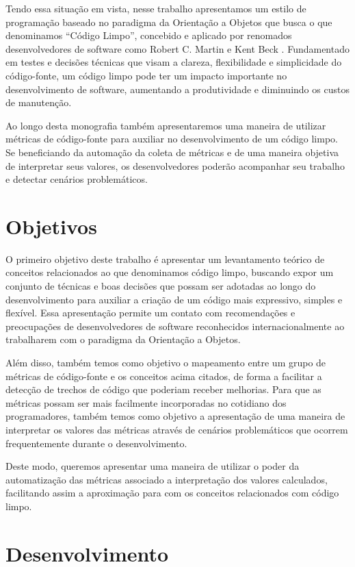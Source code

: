 Tendo essa situação em vista, nesse trabalho apresentamos um estilo de programação baseado
no paradigma da Orientação a Objetos que busca o que denominamos ``Código Limpo'', concebido e aplicado por renomados desenvolvedores de software
como Robert C. Martin \citep{Martin2008} e Kent Beck \citep{Beck2007}. Fundamentado em testes e decisões técnicas que visam a clareza, flexibilidade
e simplicidade do código-fonte, um código limpo pode ter um impacto importante no desenvolvimento 
de software, aumentando a produtividade e diminuindo os custos de manutenção.

Ao longo desta monografia também apresentaremos uma maneira de utilizar métricas de código-fonte para auxiliar no desenvolvimento
de um código limpo. Se beneficiando da automação da coleta de métricas e de uma maneira objetiva de interpretar seus valores,
os desenvolvedores poderão acompanhar seu trabalho e detectar cenários problemáticos.

\section{Objetivos}
\label{sec:objetivo}

O primeiro objetivo deste trabalho é apresentar um levantamento teórico de conceitos relacionados ao que denominamos
código limpo, buscando expor um conjunto de técnicas e boas decisões que possam ser adotadas ao longo do 
desenvolvimento para auxiliar a criação de um código mais expressivo, simples e flexível. Essa apresentação permite um 
contato com recomendações e preocupações de desenvolvedores de software reconhecidos internacionalmente ao trabalharem com 
o paradigma da Orientação a Objetos.

Além disso, também temos como objetivo o mapeamento entre um grupo de métricas de código-fonte e os conceitos acima 
citados, de forma a facilitar a detecção de trechos de código que poderiam receber melhorias. Para que as 
métricas possam ser mais facilmente incorporadas no cotidiano dos programadores, também temos como objetivo a apresentação 
de uma maneira de interpretar os valores das métricas através de cenários problemáticos que ocorrem frequentemente durante
o desenvolvimento.

Deste modo, queremos apresentar uma maneira de utilizar o poder da automatização das métricas associado a interpretação dos valores calculados, 
facilitando assim a aproximação para com os conceitos relacionados com código limpo.

\section{Desenvolvimento}
\label{sec:desenvolvimento}

